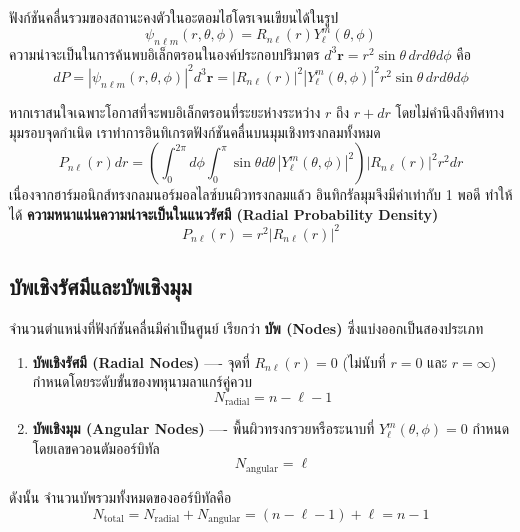 ฟังก์ชันคลื่นรวมของสถานะคงตัวในอะตอมไฮโดรเจนเขียนได้ในรูป
\begin{equation}
\psi_{n\ell m}(r, \theta, \phi) = R_{n\ell}(r) Y_\ell^m(\theta, \phi)
\end{equation}
ความน่าจะเป็นในการค้นพบอิเล็กตรอนในองค์ประกอบปริมาตร $d^3\mathbf{r} = r^2 \sin\theta \, dr d\theta d\phi$ คือ
\begin{equation}
dP = |\psi_{n\ell m}(r, \theta, \phi)|^2 d^3\mathbf{r} = |R_{n\ell}(r)|^2 |Y_\ell^m(\theta, \phi)|^2 r^2 \sin\theta \, dr d\theta d\phi
\end{equation}

หากเราสนใจเฉพาะโอกาสที่จะพบอิเล็กตรอนที่ระยะห่างระหว่าง $r$ ถึง $r + dr$ โดยไม่คำนึงถึงทิศทางมุมรอบจุดกำเนิด เราทำการอินทิเกรตฟังก์ชันคลื่นบนมุมเชิงทรงกลมทั้งหมด
\begin{equation}
P_{n\ell}(r) dr = \left( \int_0^{2\pi} d\phi \int_0^\pi \sin\theta d\theta \, |Y_\ell^m(\theta, \phi)|^2 \right) |R_{n\ell}(r)|^2 r^2 dr
\end{equation}
เนื่องจากฮาร์มอนิกส์ทรงกลมนอร์มอลไลซ์บนผิวทรงกลมแล้ว อินทิกรัลมุมจึงมีค่าเท่ากับ 1 พอดี ทำให้ได้ \textbf{ความหนาแน่นความน่าจะเป็นในแนวรัศมี (Radial Probability Density)}
\begin{equation}
P_{n\ell}(r) = r^2 |R_{n\ell}(r)|^2
\label{eq:radial_probability_density_formula}
\end{equation}

\subsection{บัพเชิงรัศมีและบัพเชิงมุม}
จำนวนตำแหน่งที่ฟังก์ชันคลื่นมีค่าเป็นศูนย์ เรียกว่า \textbf{บัพ (Nodes)} ซึ่งแบ่งออกเป็นสองประเภท
\begin{enumerate}
    \item \textbf{บัพเชิงรัศมี (Radial Nodes)} ---- จุดที่ $R_{n\ell}(r) = 0$ (ไม่นับที่ $r = 0$ และ $r = \infty$) กำหนดโดยระดับขั้นของพหุนามลาแกร์คู่ควบ
    \begin{equation}
    N_{\text{radial}} = n - \ell - 1
    \end{equation}
    \item \textbf{บัพเชิงมุม (Angular Nodes)} ---- พื้นผิวทรงกรวยหรือระนาบที่ $Y_\ell^m(\theta, \phi) = 0$ กำหนดโดยเลขควอนตัมออร์บิทัล
    \begin{equation}
    N_{\text{angular}} = \ell
    \end{equation}
\end{enumerate}
ดังนั้น จำนวนบัพรวมทั้งหมดของออร์บิทัลคือ
\begin{equation}
N_{\text{total}} = N_{\text{radial}} + N_{\text{angular}} = (n - \ell - 1) + \ell = n - 1
\end{equation}

